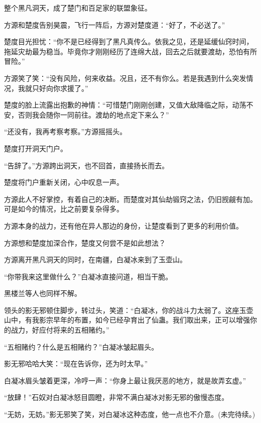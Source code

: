 \begin{this_body}
整个黑凡洞天，成了楚门和百足家的联盟象征。

方源和楚度告别昊震，飞行一阵后，方源对楚度道：“好了，不必送了。”

楚度目光担忧：“你不是已经得到了黑凡真传么。依我之见，还是延缓仙窍时间，拖延灾劫最为稳当。毕竟你才刚刚经历了连绵大战，回去之后就要渡劫，恐怕有所冒险。”

方源笑了笑：“没有风险，何来收益。况且，还不有你么。若是我遇到什么突发情况，我就只好向你求援了。”

楚度的脸上流露出抱歉的神情：“可惜楚门刚刚创建，又值大敌降临之际，动荡不安，否则我会随你一同前往。渡劫的地点定下来么？”

“还没有，我再考察考察。”方源摇摇头。

楚度打开洞天门户。

“告辞了。”方源跨出洞天，也不回首，直接扬长而去。

楚度将门户重新关闭，心中叹息一声。

方源此人不好掌控，有着自己的决断。而楚度对其仙劫锻窍之法，仍旧觊觎有加。可是如今的情况，比之前要复杂得多。

方源本身的战力，还有他在异人那边的身份，让楚度看到了更多的利用价值。

方源想和楚度加深合作，楚度又何尝不是如此想法？

方源离开黑凡洞天的同时，在南疆，白凝冰来到了玉壶山。

“你带我来这里做什么？”白凝冰直接问道，相当干脆。

黑楼兰等人也同样不解。

领头的影无邪顿住脚步，转过头，笑道：“白凝冰，你的战斗力太弱了。这座玉壶山中，有我影宗早年的布置，如今已经孕育出了仙蛊。我们取出来，正可以增强你的战力，好应付将来的五相赌约。”

“五相赌约？什么是五相赌约？”白凝冰皱起眉头。

影无邪哈哈大笑：“现在告诉你，还为时太早。”

白凝冰眉头皱着更深，冷哼一声：“你身上最让我厌恶的地方，就是故弄玄虚。”

“放肆！”石奴对白凝冰怒目圆瞪，非常不满白凝冰对影无邪的傲慢态度。

“无妨，无妨。”影无邪笑了笑，对白凝冰这种态度，他一点也不介意。(未完待续。)

\end{this_body}

